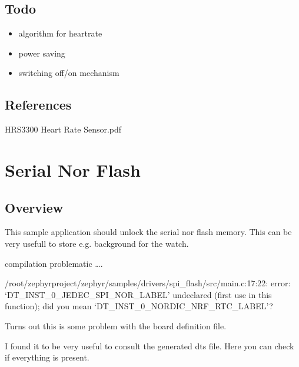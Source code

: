 \documentclass[letterpaper,10pt,english]{sphinxmanual}
\begin{document}
\subsection{Todo}
\label{\detokenize{drivers/hrs3300:todo}}\begin{itemize}
\item {} 
algorithm for heartrate

\item {} 
power saving

\item {} 
switching off/on mechanism

\end{itemize}


\subsection{References}
\label{\detokenize{drivers/hrs3300:references}}
HRS3300 Heart Rate Sensor.pdf


\section{Serial Nor Flash}
\label{\detokenize{drivers/spinor:serial-nor-flash}}\label{\detokenize{drivers/spinor::doc}}
\begin{sphinxVerbatim}[commandchars=\\\{\}]
\end{sphinxVerbatim}


\subsection{Overview}
\label{\detokenize{drivers/spinor:overview}}
This sample application should unlock the serial nor flash memory.
This can be very usefull to store e.g. background for the watch.

compilation problematic ….

/root/zephyrproject/zephyr/samples/drivers/spi\_flash/src/main.c:17:22: error: ‘DT\_INST\_0\_JEDEC\_SPI\_NOR\_LABEL’ undeclared (first use in this function); did you mean ‘DT\_INST\_0\_NORDIC\_NRF\_RTC\_LABEL’?

Turns out this is some problem with the board definition file.

I found it to be very useful to consult the generated dts file.
Here you can check if everything is present.
\end{document}

